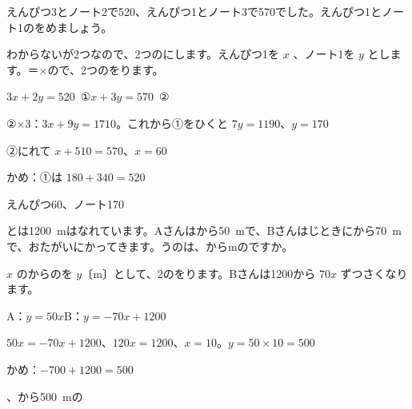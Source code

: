 \begin{reidai}[\R{買}{か}い\R{物}{もの}の\R{問題}{もん|だい}]
えんぴつ3とノート2で520、えんぴつ1とノート3で570でした。えんぴつ1とノート1のをめましょう。\par
\kangaekata わからないが2つなので、2つのにします。えんぴつ1を $x$ 、ノート1を $y$ とします。＝×ので、2つのをります。\par
\shiki $3x+2y=520$\ ①\qquad $x+3y=570$\ ②\par
\hspace*{2.6\zw}②×3：$3x+9y=1710$。これから①をひくと $7y=1190$、$y=170$\par
\hspace*{2.6\zw}②にれて $x+510=570$、$x=60$\par
\hspace*{2.6\zw}かめ：①は $180+340=520$\par
\kotae えんぴつ60、ノート170
\end{reidai}

\begin{reidai}[\R{出会}{で|あ}いの\R{問題}{もん|だい}]
とは\qty{1200}{m}はなれています。Aさんはから\qty{50}{m}で、Bさんはじときにから\qty{70}{m}で、おたがいにかってきます。うのは、からmのですか。\par
\kangaekata $x$ のからのを $y$〔m〕として、2のをります。Bさんは1200から $70x$ ずつさくなります。\par
\shiki A：$y=50x$\quad B：$y=-70x+1200$\par
\hspace*{2.6\zw}$50x=-70x+1200$、$120x=1200$、$x=10$。$y=50\times10=500$\par
\hspace*{2.6\zw}かめ：$-700+1200=500$\par
{}、から\qty{500}{m}の
\end{reidai}

